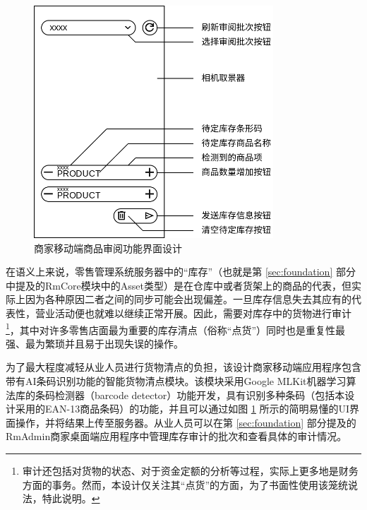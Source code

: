 \begin{figure}[htbp]
	\centering
	\includegraphics[width=0.8\textwidth, height=0.3\textheight, keepaspectratio]{./imgs/se-audit.png}
	\caption{商家移动端商品审阅功能界面设计}
	\label{fig:se-audit}
\end{figure}

在语义上来说，零售管理系统服务器中的“库存”（也就是第 \ref{sec:foundation} 部分中提及的RmCore模块中的Asset类型）是在仓库中或者货架上的商品的代表，但实际上因为各种原因二者之间的同步可能会出现偏差。一旦库存信息失去其应有的代表性，营业活动便也就难以继续正常开展。因此，需要对库存中的货物进行审计\footnote{审计还包括对货物的状态、对于资金定额的分析等过程，实际上更多地是财务方面的事务。然而，本设计仅关注其“点货”的方面，为了书面性使用该笼统说法，特此说明。}，其中对许多零售店面最为重要的库存清点（俗称“点货”）同时也是重复性最强、最为繁琐并且易于出现失误的操作。

为了最大程度减轻从业人员进行货物清点的负担，该设计商家移动端应用程序包含带有AI条码识别功能的智能货物清点模块。该模块采用Google MLKit机器学习算法库的条码检测器（barcode detector）功能开发，具有识别多种条码（包括本设计采用的EAN-13商品条码）的功能，并且可以通过如图 \ref{fig:se-audit} 所示的简明易懂的UI界面操作，并将结果上传至服务器。从业人员可以在第 \ref{sec:foundation} 部分提及的RmAdmin商家桌面端应用程序中管理库存审计的批次和查看具体的审计情况。